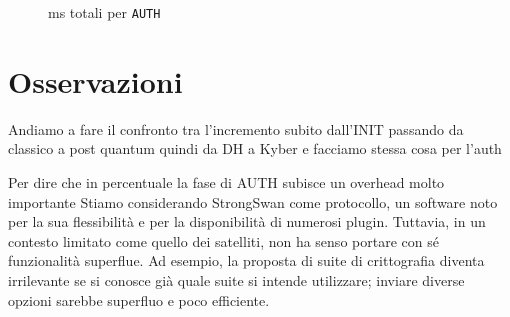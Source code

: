 \begin{figure}[h!] 
    \centering 
    \caption {ms totali per \texttt{AUTH}}
    \label{fig:tempi_auth} 
\end{figure}


\section{Osservazioni}
Andiamo a fare il confronto tra l'incremento subito dall'INIT passando da classico a post quantum 
quindi da DH a Kyber e facciamo stessa cosa per l'auth

Per dire che in percentuale la fase di AUTH subisce un overhead molto importante
Stiamo considerando StrongSwan come protocollo, un software noto per la sua
flessibilità e per la disponibilità di numerosi plugin. Tuttavia, in un contesto
limitato come quello dei satelliti, non ha senso portare con sé funzionalità
superflue. Ad esempio, la proposta di suite di crittografia diventa irrilevante
se si conosce già quale suite si intende utilizzare; inviare diverse opzioni
sarebbe superfluo e poco efficiente.

